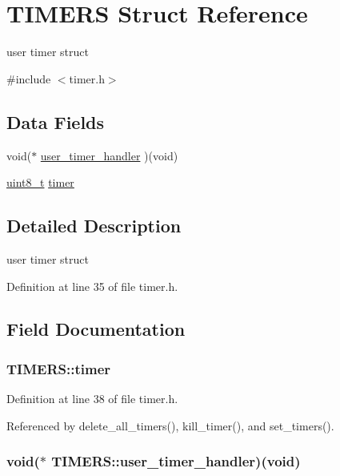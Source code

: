 \hypertarget{structTIMERS}{\section{T\-I\-M\-E\-R\-S Struct Reference}
\label{structTIMERS}
}


user timer struct  




{\ttfamily \#include $<$timer.\-h$>$}

\subsection*{Data Fields}
\begin{DoxyCompactItemize}
\item 
void($\ast$ \hyperlink{structTIMERS_a66bb89d328cf2c3f1b9362d7ea207c29}{user\-\_\-timer\-\_\-handler} )(void)
\item 
\hyperlink{send_8c_aba7bc1797add20fe3efdf37ced1182c5}{uint8\-\_\-t} \hyperlink{structTIMERS_a0b10fdb7b0e6b1d3ca49718f47c4514d}{timer}
\end{DoxyCompactItemize}


\subsection{Detailed Description}
user timer struct 

Definition at line 35 of file timer.\-h.



\subsection{Field Documentation}
\hypertarget{structTIMERS_a0b10fdb7b0e6b1d3ca49718f47c4514d}{
\subsubsection[{timer}]{ T\-I\-M\-E\-R\-S\-::timer}}\label{structTIMERS_a0b10fdb7b0e6b1d3ca49718f47c4514d}


Definition at line 38 of file timer.\-h.



Referenced by delete\-\_\-all\-\_\-timers(), kill\-\_\-timer(), and set\-\_\-timers().

\hypertarget{structTIMERS_a66bb89d328cf2c3f1b9362d7ea207c29}{
\subsubsection[{user\-\_\-timer\-\_\-handler}]{\setlength{\rightskip}{0pt plus 5cm}void($\ast$ T\-I\-M\-E\-R\-S\-::user\-\_\-timer\-\_\-handler)(void)}}\label{structTIMERS_a66bb89d328cf2c3f1b9362d7ea207c29}


